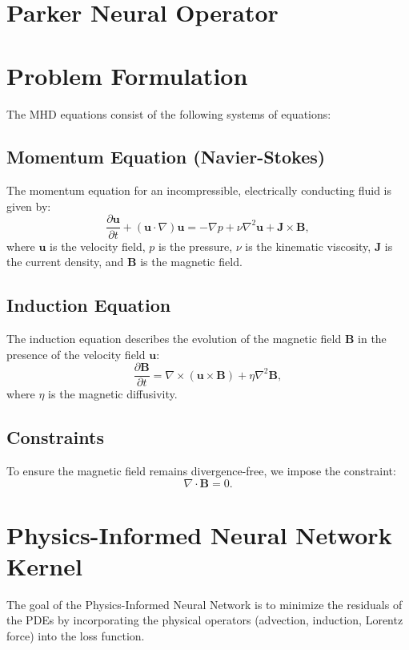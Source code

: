 \documentclass[12pt]{article}
\begin{document}
\section{Parker Neural Operator}


\section{Problem Formulation}
The MHD equations consist of the following systems of equations:

\subsection{Momentum Equation (Navier-Stokes)}
The momentum equation for an incompressible, electrically conducting fluid is given by:
\begin{equation}
\frac{\partial \mathbf{u}}{\partial t} + (\mathbf{u} \cdot \nabla) \mathbf{u} = -\nabla p + \nu \nabla^2 \mathbf{u} + \mathbf{J} \times \mathbf{B},
\end{equation}
where \( \mathbf{u} \) is the velocity field, \( p \) is the pressure, \( \nu \) is the kinematic viscosity, \( \mathbf{J} \) is the current density, and \( \mathbf{B} \) is the magnetic field.


\subsection{Induction Equation}
The induction equation describes the evolution of the magnetic field \( \mathbf{B} \) in the presence of the velocity field \( \mathbf{u} \):
\begin{equation}
\frac{\partial \mathbf{B}}{\partial t} = \nabla \times (\mathbf{u} \times \mathbf{B}) + \eta \nabla^2 \mathbf{B},
\end{equation}
where \( \eta \) is the magnetic diffusivity.

\subsection{Constraints}
To ensure the magnetic field remains divergence-free, we impose the constraint:
\begin{equation}
\nabla \cdot \mathbf{B} = 0.
\end{equation}

\section{Physics-Informed Neural Network Kernel}
The goal of the Physics-Informed Neural Network is to minimize the residuals of the PDEs by incorporating the physical operators (advection, induction, Lorentz force) into the loss function.
\end{document}
